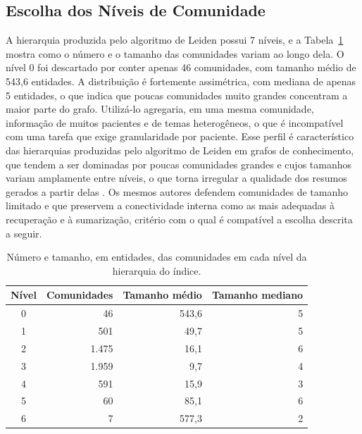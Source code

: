 \subsection{Escolha dos Níveis de Comunidade}\label{sec:met-niveis}

A hierarquia produzida pelo algoritmo de Leiden possui 7 níveis, e a Tabela~\ref{tab:met-niveis} mostra como o número e o tamanho das comunidades variam ao longo dela. O nível 0 foi descartado por conter apenas 46 comunidades, com tamanho médio de 543,6 entidades. A distribuição é fortemente assimétrica, com mediana de apenas 5 entidades, o que indica que poucas comunidades muito grandes concentram a maior parte do grafo. Utilizá-lo agregaria, em uma mesma comunidade, informação de muitos pacientes e de temas heterogêneos, o que é incompatível com uma tarefa que exige granularidade por paciente. Esse perfil é característico das hierarquias produzidas pelo algoritmo de Leiden em grafos de conhecimento, que tendem a ser dominadas por poucas comunidades grandes e cujos tamanhos variam amplamente entre níveis, o que torna irregular a qualidade dos resumos gerados a partir delas \citep{hossain2026}. Os mesmos autores defendem comunidades de tamanho limitado e que preservem a conectividade interna como as mais adequadas à recuperação e à sumarização, critério com o qual é compatível a escolha descrita a seguir.

\begin{table}[!htbp]
\centering
\caption[Número e tamanho das comunidades por nível da hierarquia]{Número e tamanho, em entidades, das comunidades em cada nível da hierarquia do índice.}
\label{tab:met-niveis}
\begin{tabular}{crrr}
\toprule
Nível & Comunidades & Tamanho médio & Tamanho mediano \\
\midrule
0 & 46    & 543,6 & 5 \\
\rowcolor{linhaDestaque}1 & 501   & 49,7  & 5 \\
\rowcolor{linhaDestaque}2 & 1.475 & 16,1  & 6 \\
3 & 1.959 & 9,7   & 4 \\
4 & 591   & 15,9  & 3 \\
5 & 60    & 85,1  & 6 \\
6 & 7     & 577,3 & 2 \\
\bottomrule
\end{tabular}
\par{}
\end{table}

